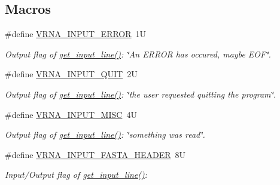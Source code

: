 \subsection*{Macros}
\begin{DoxyCompactItemize}
\item 
\mbox{\label{group__utils_gad403c9ea58f1836689404c2931419c8c}} 
\#define \mbox{\hyperlink{group__utils_gad403c9ea58f1836689404c2931419c8c}{V\+R\+N\+A\+\_\+\+I\+N\+P\+U\+T\+\_\+\+E\+R\+R\+OR}}~1U
\begin{DoxyCompactList}\small\item\em Output flag of \mbox{\hyperlink{group__utils_ga8ef1835eb83f542396f59f0b205965e5}{get\+\_\+input\+\_\+line()}}\+: {\itshape \char`\"{}\+An E\+R\+R\+O\+R has occured, maybe E\+O\+F\char`\"{}}. \end{DoxyCompactList}\item 
\mbox{\label{group__utils_ga72f3c6ca5c83d2b9baed2922d19c403d}} 
\#define \mbox{\hyperlink{group__utils_ga72f3c6ca5c83d2b9baed2922d19c403d}{V\+R\+N\+A\+\_\+\+I\+N\+P\+U\+T\+\_\+\+Q\+U\+IT}}~2U
\begin{DoxyCompactList}\small\item\em Output flag of \mbox{\hyperlink{group__utils_ga8ef1835eb83f542396f59f0b205965e5}{get\+\_\+input\+\_\+line()}}\+: {\itshape \char`\"{}the user requested quitting the program\char`\"{}}. \end{DoxyCompactList}\item 
\mbox{\label{group__utils_ga8e3241b321c9c1a78a69e59e2e019a71}} 
\#define \mbox{\hyperlink{group__utils_ga8e3241b321c9c1a78a69e59e2e019a71}{V\+R\+N\+A\+\_\+\+I\+N\+P\+U\+T\+\_\+\+M\+I\+SC}}~4U
\begin{DoxyCompactList}\small\item\em Output flag of \mbox{\hyperlink{group__utils_ga8ef1835eb83f542396f59f0b205965e5}{get\+\_\+input\+\_\+line()}}\+: {\itshape \char`\"{}something was read\char`\"{}}. \end{DoxyCompactList}\item 
\#define \mbox{\hyperlink{group__utils_ga2f0d8069e93d3ac54d9320d6bdb8e7e7}{V\+R\+N\+A\+\_\+\+I\+N\+P\+U\+T\+\_\+\+F\+A\+S\+T\+A\+\_\+\+H\+E\+A\+D\+ER}}~8U
\begin{DoxyCompactList}\small\item\em Input/\+Output flag of \mbox{\hyperlink{group__utils_ga8ef1835eb83f542396f59f0b205965e5}{get\+\_\+input\+\_\+line()}}\+:~\newline

\end{DoxyCompactList}
\end{DoxyCompactItemize}
